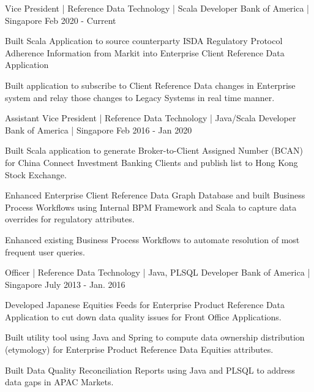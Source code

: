 \begin{cventries}
    {Vice President | Reference Data Technology | Scala Developer}
    {Bank of America | Singapore}
    {Feb 2020 - Current}
    {
      \begin{cvitems}
        \item {Built Scala Application to source counterparty ISDA Regulatory Protocol Adherence Information from Markit into Enterprise Client Reference Data Application}
        \item {Built application to subscribe to Client Reference Data changes in Enterprise system and relay those changes to Legacy Systems in real time manner.}
      \end{cvitems}
    }
    {Assistant Vice President | Reference Data Technology | Java/Scala Developer }
    {Bank of America | Singapore}
    {Feb 2016 - Jan 2020}
    {
      \begin{cvitems}
        \item {Built Scala application to generate Broker-to-Client Assigned Number (BCAN) for China Connect Investment Banking Clients and publish list to Hong Kong Stock Exchange.}
        \item {Enhanced Enterprise Client Reference Data Graph Database and built Business Process Workflows using Internal BPM Framework and Scala to capture data overrides for regulatory attributes.}
        \item {Enhanced existing Business Process Workflows to automate resolution of most frequent user queries.}
      \end{cvitems}
    }
    {Officer | Reference Data Technology | Java, PLSQL Developer}
    {Bank of America | Singapore}
    {July 2013 - Jan. 2016}
    {
      \begin{cvitems}
        \item {Developed Japanese Equities Feeds for Enterprise Product Reference Data Application to cut down data quality issues for Front Office Applications.}
        \item {Built utility tool using Java and Spring to compute data ownership distribution (etymology) for Enterprise Product Reference Data Equities attributes.}
        \item {Built Data Quality Reconciliation Reports using Java and PLSQL to address data gaps in APAC Markets.}
      \end{cvitems}
    }
\end{cventries}
